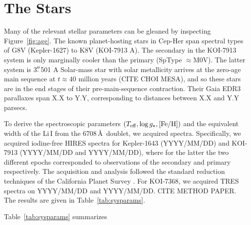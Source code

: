 \documentclass[12pt,twocolumn,linenumbers]{aastex63}
\newcommand{\cn}{Cep-Her complex} %
\begin{document}
\section{The Stars}
\label{sec:stars}



Many of the relevant stellar parameters can be gleaned by inspecting
Figure~\ref{fig:age}.  The known planet-hosting stars in Cep-Her span
spectral types of G8V (Kepler-1627) to K8V (KOI-7913 A).  The
secondary in the KOI-7913 system is only marginally cooler than the
primary (SpType $\approx$M0V).
The latter system is 3$\mbox{$.\!\!^{\prime\prime}$}$501 
A Solar-mass star with solar metallicity arrives at the zero-age main
sequence at $t\approx40$ million years (CITE CHOI MESA), and so these
stars are in the end stages of their pre-main-sequence contraction.
Their Gaia EDR3 parallaxes span X.X to Y.Y, corresponding to distances
between X.X and Y.Y parsecs.

To derive the spectroscopic parameters $(T_{\rm eff}, \log g_\star,
[{\rm Fe/H}])$ and  the equivalent width of the Li\,\textsc{I}
from the 6708\,\AA\ doublet, we acquired spectra.  Specifically, we
acquired iodine-free HIRES spectra for Kepler-1643 (YYYY/MM/DD) and
KOI-7913 (YYYY/MM/DD and YYYY/MM/DD), where for the latter the two
different epochs corresponded to observations of the secondary and
primary respectively.  The acquisition and analysis followed the
standard reduction techniques of the California Planet Survey
\citep{howard_cps_2010}.  For KOI-7368, we acquired TRES spectra on
YYYY/MM/DD and YYYY/MM/DD.  CITE METHOD PAPER.
The results are given in Table~\ref{tab:sysparams}.

Table~\ref{tab:sysparams} summarizes
%
%
%
%
%
\end{document}
